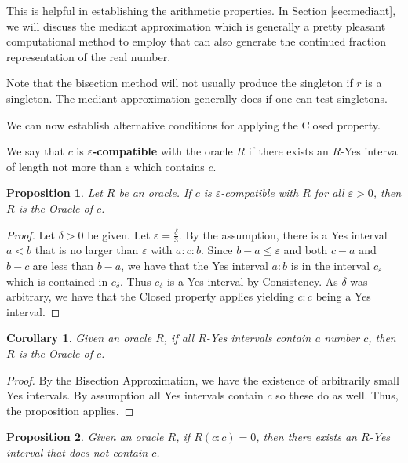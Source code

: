 \documentclass[12pt]{article}
\newtheorem{corollary}{Corollary}[subsection]
\newtheorem{proposition}{Proposition}[subsection]
\begin{document}
This is helpful in establishing the arithmetic properties. In Section \ref{sec:mediant}, we will discuss the mediant approximation which is generally a pretty pleasant computational method to employ that can also generate the continued fraction representation of the real number. 

Note that the bisection method will not usually produce the singleton if $r$ is a singleton. The mediant approximation generally does if one can test singletons. 


We can now establish alternative conditions for applying the Closed property. 

We say that $c$ is \textbf{$\varepsilon$-compatible} with the oracle $R$ if there exists an $R$-Yes interval of length not more than $\varepsilon$ which contains $c$.

\begin{proposition}\label{pr:closed-epsilon}
    Let $R$ be an oracle. If $c$ is $\varepsilon$-compatible with $R$ for all $\varepsilon >0$, then $R$ is the Oracle of $c$.  
\end{proposition}

\begin{proof}
    Let $\delta > 0$ be given. Let $\varepsilon = \frac{\delta}{3}$. By the assumption, there is a Yes interval $a\lt b$ that is no larger than $\varepsilon$ with $a:c:b$. Since $b-a \leq \varepsilon$ and both $c-a$ and $b-c$ are less than $b-a$, we have that the Yes interval $a:b$ is in the interval $c_{\varepsilon}$ which is contained in $c_{\delta}$. Thus $c_{\delta}$ is a Yes interval by Consistency. As $\delta$ was arbitrary, we have that the Closed property applies yielding $c:c$ being a Yes interval. 
\end{proof}



\begin{corollary}\label{cor:closed-all}
        Given an oracle $R$, if all $R$-Yes intervals contain a number $c$, then $R$ is the Oracle of $c$.
\end{corollary}

\begin{proof}
    By the Bisection Approximation, we have the existence of arbitrarily small Yes intervals. By assumption all Yes intervals contain $c$ so these do as well. Thus, the proposition applies.
\end{proof}


\begin{proposition}
    Given an oracle $R$, if $R(c:c)=0$, then there exists an $R$-Yes interval that does not contain $c$.
\end{proposition}
\end{document}
